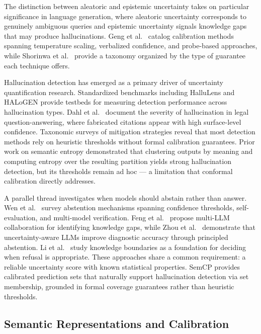 \documentclass{article}
\begin{document}
\label{sec:uncertainty_quantification_in_large_lang}

The distinction between aleatoric and epistemic uncertainty \cite{hullermeier2021aleatoric} takes on particular significance in language generation, where aleatoric uncertainty corresponds to genuinely ambiguous queries and epistemic uncertainty signals knowledge gaps that may produce hallucinations. Geng et al.\ \cite{geng2024survey} catalog calibration methods spanning temperature scaling, verbalized confidence, and probe-based approaches, while Shorinwa et al.\ \cite{shorinwa2024survey} provide a taxonomy organized by the type of guarantee each technique offers.

Hallucination detection has emerged as a primary driver of uncertainty quantification research. Standardized benchmarks including HalluLens \cite{bang2025hallulens} and HALoGEN \cite{ravichander2025halogen} provide testbeds for measuring detection performance across hallucination types. Dahl et al.\ \cite{dahl2024large} document the severity of hallucination in legal question-answering, where fabricated citations appear with high surface-level confidence. Taxonomic surveys of mitigation strategies \cite{kazlaris2025illusion} reveal that most detection methods rely on heuristic thresholds without formal calibration guarantees. Prior work on semantic entropy demonstrated that clustering outputs by meaning and computing entropy over the resulting partition yields strong hallucination detection, but its thresholds remain ad hoc --- a limitation that conformal calibration directly addresses.

A parallel thread investigates when models should abstain rather than answer. Wen et al.\ \cite{wen2025know} survey abstention mechanisms spanning confidence thresholds, self-evaluation, and multi-model verification. Feng et al.\ \cite{feng2024dont} propose multi-LLM collaboration for identifying knowledge gaps, while Zhou et al.\ \cite{zhou2025uncertaintyaware} demonstrate that uncertainty-aware LLMs improve diagnostic accuracy through principled abstention. Li et al.\ \cite{li2025knowledge} study knowledge boundaries as a foundation for deciding when refusal is appropriate. These approaches share a common requirement: a reliable uncertainty score with known statistical properties. SemCP provides calibrated prediction sets that naturally support hallucination detection via set membership, grounded in formal coverage guarantees rather than heuristic thresholds.

\subsection{Semantic Representations and Calibration}
\end{document}
